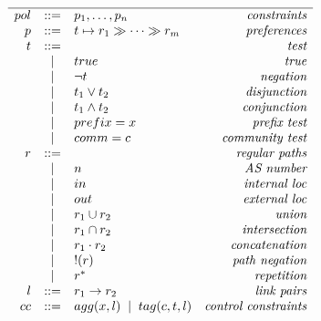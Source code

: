 \begin{figure}
  \begin{minipage}[t]{.45\linewidth}
  \vspace*{-1\baselineskip}
  \[ \begin{array}{rclr}
    \hline

     pol     &::=& p_1, \dots, p_n & \textit{constraints} \\
     p       &::=& t \mapsto r_1 \gg \dots \gg r_m & \textit{preferences} \\
     t       &::=& & \textit{test} \\
         &\;\;|\;\;& true & \textit{true} \\
         &\;\;|\;\;& \neg t & \textit{negation} \\
         &\;\;|\;\;& t_1 \vee t_2 & \textit{disjunction} \\
         &\;\;|\;\;& t_1 \wedge t_2 & \textit{conjunction} \\
         &\;\;|\;\;& prefix = x & \textit{prefix test} \\
         &\;\;|\;\;& comm = c & \textit{community test} \\
     r       &::=& & \textit{regular paths} \\
         &\;\;|\;\;& n & \textit{AS number} \\
         &\;\;|\;\;& in & \textit{internal loc} \\
         &\;\;|\;\;& out & \textit{external loc} \\
         &\;\;|\;\;& r_1 \cup r_2 & \textit{union} \\
         &\;\;|\;\;& r_1 \cap r_2 & \textit{intersection} \\
         &\;\;|\;\;& r_1 \cdot r_2 & \textit{concatenation} \\
         &\;\;|\;\;& !(r) & \textit{path negation} \\
         &\;\;|\;\;& r^* & \textit{repetition} \\
     l       &::=& r_1 \rightarrow r_2 & \textit{link pairs} \\
     cc     &::=& agg(x, l) \;\;|\;\; tag(c, t, l) & \textit{control constraints} \\
  \end{array} \]


\end{minipage}
\end{figure}
